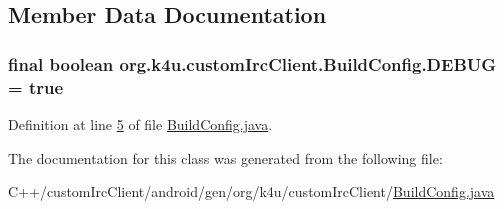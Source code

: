 \subsection{Member Data Documentation}
\hypertarget{classorg_1_1k4u_1_1custom_irc_client_1_1_build_config_a135b5a8667d45f9c291cd2f86a4338f2}{
\subsubsection[{D\-E\-B\-U\-G}]{\setlength{\rightskip}{0pt plus 5cm}final boolean org.\-k4u.\-custom\-Irc\-Client.\-Build\-Config.\-D\-E\-B\-U\-G = true\hspace{0.3cm}{\ttfamily [static]}}}\label{d5/de7/classorg_1_1k4u_1_1custom_irc_client_1_1_build_config_a135b5a8667d45f9c291cd2f86a4338f2}


Definition at line \hyperlink{_build_config_8java_source_l00005}{5} of file \hyperlink{_build_config_8java_source}{Build\-Config.\-java}.



The documentation for this class was generated from the following file\-:\begin{DoxyCompactItemize}
\item 
C++/custom\-Irc\-Client/android/gen/org/k4u/custom\-Irc\-Client/\hyperlink{_build_config_8java}{Build\-Config.\-java}\end{DoxyCompactItemize}

